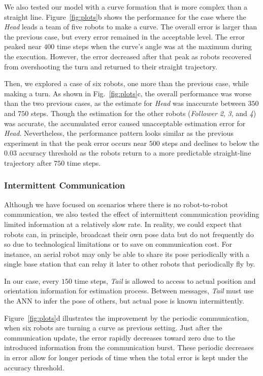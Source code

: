 \documentclass[letterpaper, 10 pt, conference]{ieeeconf}  %
\begin{document}
	We also tested our model with a curve formation that is more complex
	than a straight line. Figure~\ref{fig:plots}b shows the performance for
	the case where the \emph{Head} leads a team of five robots to make a
	curve. The overall error is larger than the previous case, but every
	error remained in the acceptable level. The error peaked near $400$ time
	steps when the curve's angle was at the maximum during the execution.
	However, the error decreased after that peak as robots recovered from
	overshooting the turn and returned to their straight trajectory.
	
	Then, we explored a case of six robots, one more than the previous
	case, while making a turn. As shown in Fig.~\ref{fig:plots}c, the
	overall performance was worse than the two previous cases, as the
	estimate for \emph{Head} was inaccurate between $350$ and $750$ steps.
	Though the estimation for the other robots (\emph{Follower 2}, \emph{3},
	and \emph{4}) was accurate, the accumulated error caused unacceptable
	estimation error for \emph{Head}. Nevertheless, the performance pattern
	looks similar as the previous experiment in that the peak error occurs
	near $500$ steps and declines to below the $0.03$ accuracy threshold as
	the robots return to a more predictable straight-line trajectory after
	$750$ time steps.
	
	\subsubsection{Intermittent Communication}
	\label{sec:intermittentcomm}
	
	Although we have focused on scenarios where there is no robot-to-robot
	communication, we also tested the effect of intermittent communication
	providing limited information at a relatively slow rate. In reality, we
	could expect that robots can, in principle, broadcast their own pose
	data but do not frequently do so due to technological limitations or to
	save on communication cost. For instance, an aerial robot may only be
	able to share its pose periodically with a single base station that can
	relay it later to other robots that periodically fly by.
	
	In our case, every $150$ time steps, \emph{Tail} is allowed to access to
	actual position and orientation information for estimation process.
	Between messages, \emph{Tail} must use the ANN to infer the pose of
	others, but actual pose is known intermittently.
	
	Figure~\ref{fig:plots}d illustrates the improvement by the periodic
	communication, when six robots are turning a curve as previous setting.
	Just after the communication update, the error rapidly decreases toward
	zero due to the introduced information from the communication burst. These
	periodic decreases in error allow for longer periods of time when the total
	error is kept under the accuracy threshold.
	
\end{document}
